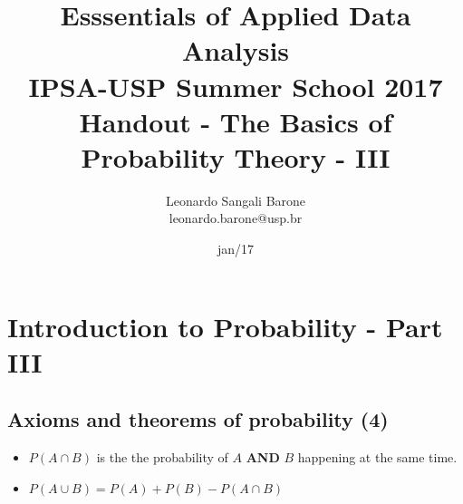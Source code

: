 \documentclass[11pt]{article}
\title{\textbf{Esssentials of Applied Data Analysis\\
				IPSA-USP Summer School 2017}\newline\\
				Handout - The Basics of Probability Theory - III}
\author{Leonardo Sangali Barone\\leonardo.barone@usp.br}
\date{jan/17}
\begin{document}
\maketitle

\section*{Introduction to Probability - Part III}

	\subsection*{Axioms and theorems of probability (4)}
	\begin{itemize}
		\item $P(A \cap B)$ is the the probability of $A$ \textbf{AND} $B$ happening at the same time.																																																																																																																		
		\item  $P(A \cup B) = P(A) + P(B) - P(A \cap B)$ 
	\end{itemize}
\end{document}
